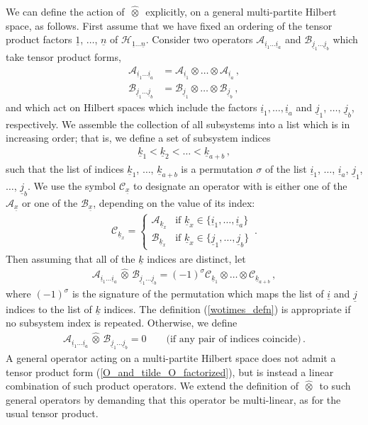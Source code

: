\documentclass[12pt]{article}
\newcommand{\ul}[1]{{\underline{#1}}}
\newcommand{\wotimes}{ \, \widehat{\otimes} \, }
\numberwithin{equation}{section}
\newcommand{\Honeton}{{\mathcal{H}_{\ul{1} \ldots \ul{n}}}}
\begin{document}
We can define the action of $\wotimes$ explicitly, on a general multi-partite Hilbert space, as follows. First assume that we have fixed an ordering of the tensor product factors $\ul{1}$, $\ldots$, $\ul{n}$ of $\Honeton$. Consider two operators $\mathcal{A}_{\ul{i}_1 \ldots \ul{i}_a}$ and $\mathcal{B}_{\ul{j}_1 \ldots \ul{j}_b}$ which take tensor product forms,
%
\begin{align}\label{O_and_tilde_O_factorized}
    \mathcal{A}_{\ul{i}_1 \ldots \ul{i}_a} &= \mathcal{A}_{\ul{i}_1} \otimes \ldots \otimes \mathcal{A}_{\ul{i}_a} \, , \nonumber \\
    \mathcal{B}_{\ul{j}_1 \ldots \ul{j}_b} &= \mathcal{B}_{\ul{j}_1} \otimes \ldots \otimes \mathcal{B}_{\ul{j}_b} \, ,
\end{align}
%
and which act on Hilbert spaces which include the factors $\ul{i}_1, \ldots,  \ul{i}_a$ and $\ul{j}_1$, $\ldots$, $\ul{j}_b$, respectively. We assemble the collection of all subsystems into a list which is in increasing order; that is, we define a set of subsystem indices
%
\begin{align}\label{k_indices}
    \ul{k}_1 < \ul{k}_2 <  \ldots < \ul{k}_{a + b} \, ,
\end{align}
%
such that the list of indices $\ul{k}_1$, $\ldots$, $\ul{k}_{a + b}$ is a permutation $\sigma$ of the list $\ul{i}_1$, $\ldots$,  $\ul{i}_a$, $\ul{j}_1$, $\ldots$, $\ul{j}_b$. We use the symbol $\mathcal{C}_{\ul{x}}$ to designate an operator with is either one of the $\mathcal{A}_{\ul{x}}$ or one of the $\mathcal{B}_{\ul{x}}$, depending on the value of its index:
%
\begin{align}
    \mathcal{C}_{\ul{k}_x} = \begin{cases} \mathcal{A}_{\ul{k}_x} &\text{if } \ul{k}_x \in \{ \ul{i}_1, \ldots,  \ul{i}_a \} \\ \mathcal{B}_{\ul{k}_x} &\text{if } \ul{k}_x \in \{ \ul{j}_1, \ldots, \ul{j}_b \} \end{cases} \, .
\end{align}
%
Then assuming that all of the $\ul{k}$ indices are distinct, let
%
\begin{align}\label{wotimes_defn}
    \mathcal{A}_{\ul{i}_1 \ldots \ul{i}_a} \wotimes \mathcal{B}_{\ul{j}_1 \ldots \ul{j}_b} = \left( - 1 \right)^\sigma \mathcal{C}_{\ul{k}_1} \otimes \ldots \otimes \mathcal{C}_{\ul{k}_{a + b}} \, ,
\end{align}
%
where $(- 1)^\sigma$ is the signature of the permutation which maps the list of $\ul{i}$ and $\ul{j}$ indices to the list of $\ul{k}$ indices. The definition (\ref{wotimes_defn}) is appropriate if no subsystem index is repeated. Otherwise, we define
%
\begin{align}\label{wotimes_defn_ZERO}
    \mathcal{A}_{\ul{i}_1 \ldots \ul{i}_a} \wotimes \mathcal{B}_{\ul{j}_1 \ldots \ul{j}_b} = 0 \qquad \text{(if any pair of indices coincide)} \, .
\end{align}
%
A general operator acting on a multi-partite Hilbert space does not admit a tensor product form (\ref{O_and_tilde_O_factorized}), but is instead a linear combination of such product operators. We extend the definition of $\wotimes$ to such general operators by demanding that this operator be multi-linear, as for the usual tensor product.
\end{document}
